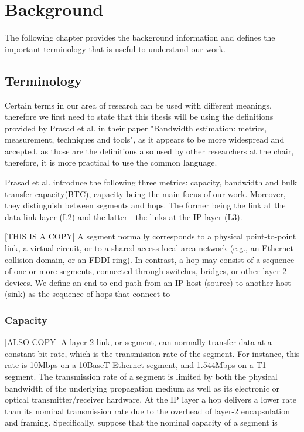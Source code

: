 \chapter{Background}
The following chapter provides the background information and defines the important terminology that is useful to understand our work.

\section{Terminology}
Certain terms in our area of research can be used with different meanings, therefore we first need to state that this thesis will be using the definitions provided by Prasad et al. \cite{Prasad2003} in their paper "Bandwidth estimation: metrics, measurement, techniques and tools", as it appears to be more widespread and accepted, as those are the definitions also used by other researchers at the chair, therefore, it is more practical to use the common language.

Prasad et al.\cite{Prasad2003} introduce the following three metrics: capacity, bandwidth and bulk transfer capacity(BTC), capacity being the main focus of our work.
Moreover, they distinguish between segments and hops. The former being the link at the data link layer (L2) and the latter - the links at the IP layer (L3).

[THIS IS A COPY]
A segment normally corresponds to a physical point-to-point link, a virtual circuit, or to a shared access local area network (e.g., an Ethernet collision
domain, or an FDDI ring). In contrast, a hop may consist of a sequence of one or more segments, connected through switches, bridges, or other layer-2 devices. We
define an end-to-end path from an IP host (source) to another host (sink) as the sequence of hops that connect to 

\subsection*{Capacity}
[ALSO COPY]
A layer-2 link, or segment, can normally transfer data at a constant bit rate, which is the transmission rate of the segment. For instance, this rate is 10Mbps
on a 10BaseT Ethernet segment, and 1.544Mbps on a T1 segment. The transmission rate of a segment is limited by both the physical bandwidth of the underlying
propagation medium as well as its electronic or optical transmitter/receiver hardware. 
At the IP layer a hop delivers a lower rate than its nominal transmission rate due to the overhead of layer-2 encapsulation and framing. Specifically, suppose that the nominal capacity of a segment is


